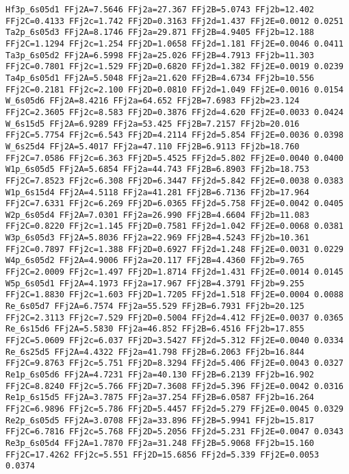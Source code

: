 {\begin{verbatim}
Hf3p_6s05d1 FFj2A=7.5646 FFj2a=27.367 FFj2B=5.0743 FFj2b=12.402 FFj2C=0.4133 FFj2c=1.742 FFj2D=0.3163 FFj2d=1.437 FFj2E=0.0012 0.0251 
Ta2p_6s05d3 FFj2A=8.1746 FFj2a=29.871 FFj2B=4.9405 FFj2b=12.188 FFj2C=1.1294 FFj2c=1.254 FFj2D=1.0658 FFj2d=1.181 FFj2E=0.0046 0.0411 
Ta3p_6s05d2 FFj2A=6.5998 FFj2a=25.026 FFj2B=4.7913 FFj2b=11.303 FFj2C=0.7801 FFj2c=1.529 FFj2D=0.6820 FFj2d=1.382 FFj2E=0.0019 0.0239 
Ta4p_6s05d1 FFj2A=5.5048 FFj2a=21.620 FFj2B=4.6734 FFj2b=10.556 FFj2C=0.2181 FFj2c=2.100 FFj2D=0.0810 FFj2d=1.049 FFj2E=0.0016 0.0154 
W_6s05d6 FFj2A=8.4216 FFj2a=64.652 FFj2B=7.6983 FFj2b=23.124 FFj2C=2.3605 FFj2c=8.583 FFj2D=0.3876 FFj2d=4.620 FFj2E=0.0033 0.0424 
W_6s15d5 FFj2A=6.9289 FFj2a=53.425 FFj2B=7.2157 FFj2b=20.016 FFj2C=5.7754 FFj2c=6.543 FFj2D=4.2114 FFj2d=5.854 FFj2E=0.0036 0.0398 
W_6s25d4 FFj2A=5.4017 FFj2a=47.110 FFj2B=6.9113 FFj2b=18.760 FFj2C=7.0586 FFj2c=6.363 FFj2D=5.4525 FFj2d=5.802 FFj2E=0.0040 0.0400 
W1p_6s05d5 FFj2A=5.6854 FFj2a=44.743 FFj2B=6.8903 FFj2b=18.753 FFj2C=7.8523 FFj2c=6.308 FFj2D=6.3447 FFj2d=5.842 FFj2E=0.0038 0.0383 
W1p_6s15d4 FFj2A=4.5118 FFj2a=41.281 FFj2B=6.7136 FFj2b=17.964 FFj2C=7.6331 FFj2c=6.269 FFj2D=6.0365 FFj2d=5.758 FFj2E=0.0042 0.0405 
W2p_6s05d4 FFj2A=7.0301 FFj2a=26.990 FFj2B=4.6604 FFj2b=11.083 FFj2C=0.8220 FFj2c=1.145 FFj2D=0.7581 FFj2d=1.042 FFj2E=0.0068 0.0381 
W3p_6s05d3 FFj2A=5.8036 FFj2a=22.969 FFj2B=4.5243 FFj2b=10.361 FFj2C=0.7897 FFj2c=1.388 FFj2D=0.6927 FFj2d=1.248 FFj2E=0.0031 0.0229 
W4p_6s05d2 FFj2A=4.9006 FFj2a=20.117 FFj2B=4.4360 FFj2b=9.765 FFj2C=2.0009 FFj2c=1.497 FFj2D=1.8714 FFj2d=1.431 FFj2E=0.0014 0.0145 
W5p_6s05d1 FFj2A=4.1973 FFj2a=17.967 FFj2B=4.3791 FFj2b=9.255 FFj2C=1.8830 FFj2c=1.603 FFj2D=1.7205 FFj2d=1.518 FFj2E=0.0004 0.0088 
Re_6s05d7 FFj2A=6.7574 FFj2a=55.529 FFj2B=6.7931 FFj2b=20.125 FFj2C=2.3113 FFj2c=7.529 FFj2D=0.5004 FFj2d=4.412 FFj2E=0.0037 0.0365 
Re_6s15d6 FFj2A=5.5830 FFj2a=46.852 FFj2B=6.4516 FFj2b=17.855 FFj2C=5.0609 FFj2c=6.037 FFj2D=3.5427 FFj2d=5.312 FFj2E=0.0040 0.0334 
Re_6s25d5 FFj2A=4.4322 FFj2a=41.798 FFj2B=6.2063 FFj2b=16.844 FFj2C=9.8763 FFj2c=5.751 FFj2D=8.3294 FFj2d=5.406 FFj2E=0.0043 0.0327 
Re1p_6s05d6 FFj2A=4.7231 FFj2a=40.130 FFj2B=6.2139 FFj2b=16.902 FFj2C=8.8240 FFj2c=5.766 FFj2D=7.3608 FFj2d=5.396 FFj2E=0.0042 0.0316 
Re1p_6s15d5 FFj2A=3.7875 FFj2a=37.254 FFj2B=6.0587 FFj2b=16.264 FFj2C=6.9896 FFj2c=5.786 FFj2D=5.4457 FFj2d=5.279 FFj2E=0.0045 0.0329 
Re2p_6s05d5 FFj2A=3.0708 FFj2a=33.896 FFj2B=5.9941 FFj2b=15.817 FFj2C=6.7816 FFj2c=5.768 FFj2D=5.2056 FFj2d=5.231 FFj2E=0.0047 0.0343 
Re3p_6s05d4 FFj2A=1.7870 FFj2a=31.248 FFj2B=5.9068 FFj2b=15.160 FFj2C=17.4262 FFj2c=5.551 FFj2D=15.6856 FFj2d=5.339 FFj2E=0.0053 0.0374 

\end{verbatim}}
